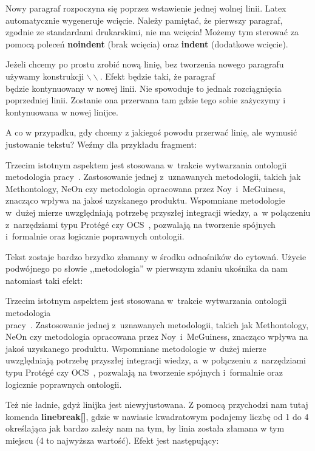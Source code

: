 \documentclass[twoside,a4paper]{book}
\begin{document}
Nowy paragraf rozpoczyna się poprzez wstawienie jednej wolnej linii. Latex automatycznie wygeneruje wcięcie. Należy pamiętać, że pierwszy paragraf, zgodnie ze standardami drukarskimi, nie ma wcięcia! Możemy tym sterować za pomocą poleceń \textbf{noindent} (brak wcięcia) oraz \textbf{indent} (dodatkowe wcięcie).

Jeżeli chcemy po prostu zrobić nową linię, bez tworzenia nowego paragrafu używamy konstrukcji $\backslash\backslash$. Efekt będzie taki, że paragraf\\
będzie kontynuowany w nowej linii. Nie spowoduje to jednak rozciągnięcia poprzedniej linii. Zostanie ona przerwana tam gdzie tego sobie zażyczymy i kontynuowana w nowej linijce.

A co w przypadku, gdy chcemy z jakiegoś powodu przerwać linię, ale wymusić justowanie tekstu? Weźmy dla przykładu fragment:

Trzecim istotnym aspektem jest stosowana w~trakcie wytwarzania ontologii metodologia pracy~\cite{boinski2012kaskbook,boinski2011security}. Zastosowanie jednej z~uznawanych metodologii, takich jak Methontology, NeOn czy metodologia opracowana przez Noy~i~McGuiness, znacząco wpływa na jakoś uzyskanego produktu. Wspomniane metodologie w~dużej mierze uwzględniają potrzebę przyszłej integracji wiedzy, a~w połączeniu z~narzędziami typu Protégé czy OCS~\cite{boinski2007kaskbook,boinski2009ocs,boinski2010zespolowa}, pozwalają na tworzenie spójnych i~formalnie oraz logicznie poprawnych ontologii.

Tekst zostaje bardzo brzydko złamany w środku odnośników do cytowań. Użycie podwójnego po słowie ,,metodologia'' w pierwszym zdaniu ukośnika da nam natomiast taki efekt:

Trzecim istotnym aspektem jest stosowana w~trakcie wytwarzania ontologii metodologia \\ pracy~\cite{boinski2012kaskbook,boinski2011security}. Zastosowanie jednej z~uznawanych metodologii, takich jak Methontology, NeOn czy metodologia opracowana przez Noy~i~McGuiness, znacząco wpływa na jakoś uzyskanego produktu. Wspomniane metodologie w~dużej mierze uwzględniają potrzebę przyszłej integracji wiedzy, a~w połączeniu z~narzędziami typu Protégé czy OCS~\cite{boinski2007kaskbook,boinski2009ocs,boinski2010zespolowa}, pozwalają na tworzenie spójnych i~formalnie oraz logicznie poprawnych ontologii.

Też nie ładnie, gdyż linijka jest niewyjustowana. Z pomocą przychodzi nam tutaj komenda \textbf{linebreak[]}, gdzie w nawiasie kwadratowym podajemy liczbę od 1 do 4 określająca jak bardzo zależy nam na tym, by linia została złamana w tym miejscu (4 to najwyższa wartość). Efekt jest następujący:
\end{document}
